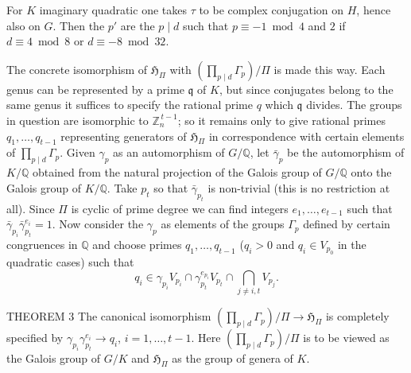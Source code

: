 For $K$ imaginary quadratic one takes $\tau$ to be complex conjugation on
$H$, hence also on $G$. Then the $p'$ are the $p\mid d$ such that
$p\equiv -1\bmod 4$ and $2$ if $d\equiv 4\bmod 8$ or $d\equiv -8\bmod 32$.

The concrete isomorphism of $\mathfrak{H}_{\Pi}$ with
$(\prod_{p\mid d}\Gamma_{p})/\Pi$ is made this way. Each genus can be
represented by a prime $\mathfrak{q}$ of $K$, but since conjugates belong
to the same genus it suffices to specify the rational prime $q$ which
$\mathfrak{q}$ divides. The groups in question are isomorphic to
$\mathbb{Z}_{n}^{\,t-1}$; so it remains only to give rational primes
$q_{1},\ldots,q_{t-1}$ representing generators of $\mathfrak{H}_{\Pi}$ in
correspondence with certain elements of $\prod_{p\mid d}\Gamma_{p}$.
Given $\gamma_{p}$ as an automorphism of $G/\mathbb{Q}$, let
$\bar{\gamma}_{p}$ be the automorphism of $K/\mathbb{Q}$ obtained from the
natural projection of the Galois group of $G/\mathbb{Q}$ onto the Galois
group of $K/\mathbb{Q}$. Take $p_{t}$ so that $\bar{\gamma}_{p_{t}}$ is
non-trivial (this is no restriction at all). Since $\Pi$ is cyclic of
prime degree we can find integers $e_{1},\ldots,e_{t-1}$ such that
$\bar{\gamma}_{p_{i}}\bar{\gamma}_{p_{t}}^{e_{i}}=1$. Now consider the
$\gamma_{p}$ as elements of the groups $\Gamma_{p}$ defined by certain
congruences in $\mathbb{Q}$ and choose primes $q_{1},\ldots,q_{t-1}$
($q_{i}>0$ and $q_{i}\in V_{p_{0}}$ in the quadratic cases) such that
\[
q_{i}\in\gamma_{p_{i}}V_{p_{i}}\cap\gamma_{p_{t}}^{e_{p_{i}}}V_{p_{t}}
\cap\bigcap_{j\neq i,t}V_{p_{j}}.
\]

\begin{namedstmt}{THEOREM 3}
The canonical isomorphism $(\prod_{p\mid d}\Gamma_{p})/\Pi
\to\mathfrak{H}_{\Pi}$ is completely specified by
$\gamma_{p_{i}}\gamma_{p_{t}}^{e_{i}}\to q_{i}$, $i=1,\ldots,t-1$. Here
$(\prod_{p\mid d}\Gamma_{p})/\Pi$ is to be viewed as the Galois group of
$G/K$ and $\mathfrak{H}_{\Pi}$ as the group of genera of $K$.
\end{namedstmt}

